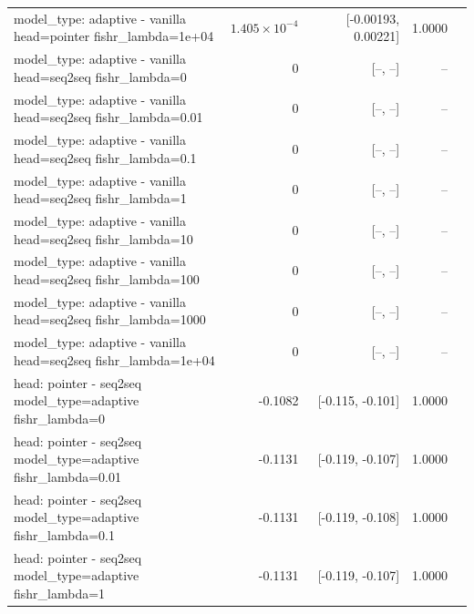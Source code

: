 \documentclass[10pt]{article}
\makeatletter
\newcommand{\stackcell}[1]{\begin{tabular}[t]{@{}l@{}}#1\end{tabular}}
\makeatother
\begin{document}
{\begin{longtable}{lrrrl}
\stackcell{model\_type: adaptive - vanilla\\\footnotesize head=pointer fishr\_lambda=1e+04 } & $1.405\times10^{-4}$ & [-0.00193, 0.00221] & 1.0000 & \\
\stackcell{model\_type: adaptive - vanilla\\\footnotesize head=seq2seq fishr\_lambda=0 } & 0 & [--, --] & -- & \\
\stackcell{model\_type: adaptive - vanilla\\\footnotesize head=seq2seq fishr\_lambda=0.01 } & 0 & [--, --] & -- & \\
\stackcell{model\_type: adaptive - vanilla\\\footnotesize head=seq2seq fishr\_lambda=0.1 } & 0 & [--, --] & -- & \\
\stackcell{model\_type: adaptive - vanilla\\\footnotesize head=seq2seq fishr\_lambda=1 } & 0 & [--, --] & -- & \\
\stackcell{model\_type: adaptive - vanilla\\\footnotesize head=seq2seq fishr\_lambda=10 } & 0 & [--, --] & -- & \\
\stackcell{model\_type: adaptive - vanilla\\\footnotesize head=seq2seq fishr\_lambda=100 } & 0 & [--, --] & -- & \\
\stackcell{model\_type: adaptive - vanilla\\\footnotesize head=seq2seq fishr\_lambda=1000 } & 0 & [--, --] & -- & \\
\stackcell{model\_type: adaptive - vanilla\\\footnotesize head=seq2seq fishr\_lambda=1e+04 } & 0 & [--, --] & -- & \\
\stackcell{head: pointer - seq2seq\\\footnotesize model\_type=adaptive fishr\_lambda=0 } & -0.1082 & [-0.115, -0.101] & 1.0000 & \\
\stackcell{head: pointer - seq2seq\\\footnotesize model\_type=adaptive fishr\_lambda=0.01 } & -0.1131 & [-0.119, -0.107] & 1.0000 & \\
\stackcell{head: pointer - seq2seq\\\footnotesize model\_type=adaptive fishr\_lambda=0.1 } & -0.1131 & [-0.119, -0.108] & 1.0000 & \\
\stackcell{head: pointer - seq2seq\\\footnotesize model\_type=adaptive fishr\_lambda=1 } & -0.1131 & [-0.119, -0.107] & 1.0000 & \\

\end{longtable}}
\end{document}
